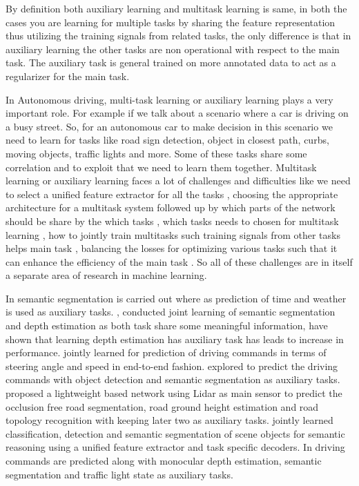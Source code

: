     By definition both auxiliary learning and multitask learning is same, in both the cases you are learning for multiple tasks by sharing the feature representation thus utilizing the training signals from related tasks, the only difference is that in auxiliary learning the other tasks are non operational with respect to the main task. The auxiliary task is general trained on more annotated data to act as a regularizer for the main task. 
    
    In Autonomous driving, multi-task learning or auxiliary learning plays a very important role. For example if we talk about a scenario where a car is driving on a busy street. So, for an autonomous car to make decision in this scenario we need to learn for tasks like road sign detection, object in closest path, curbs, moving objects, traffic lights and more. Some of these tasks share some correlation and to exploit that we need to learn them together. Multitask learning or auxiliary learning faces a lot of challenges and difficulties like we need to select a unified feature extractor for all the tasks \cite{DBLP:journals/corr/abs-2108-11353}, choosing the appropriate architecture for a multitask system followed up by which parts of the network should be share by the which tasks \cite {Liu_2020_ACCV} \cite{ruder2018latent} \cite{DBLP:journals/corr/abs-1904-02920}, which tasks needs to chosen for multitask learning \cite{DBLP:journals/corr/abs-2110-07301} \cite{DBLP:journals/corr/abs-1904-04153}, how to jointly train multitasks such training signals from other tasks helps main task \cite{DBLP:journals/corr/abs-1903-12117} \cite{DBLP:journals/corr/abs-2007-06889} \cite{DBLP:journals/corr/abs-2001-06782} \cite{Guo_2018_ECCV}, balancing the losses for optimizing various tasks such that it can enhance the efficiency of the main task \cite{DBLP:journals/corr/abs-1904-08492} \cite{pmlr-v80-chen18a} \cite{du2020adapting}. So all of these challenges are in itself a separate area of research in machine learning. 
    
    In \cite{DBLP:journals/corr/abs-1805-06334} semantic segmentation is carried out where as prediction of time and weather is used as auxiliary tasks. \cite{teichmann2018multinet}, \cite{7785137} conducted joint learning of semantic segmentation and depth estimation as both task share some meaningful information, have shown that learning depth estimation has auxiliary task has leads to increase in performance. \cite{yang2018endtoend} jointly learned for prediction of driving commands in terms of steering angle and speed in end-to-end fashion. \cite{Wang2019EndtoEndSU} explored to predict the driving commands with object detection and semantic segmentation as auxiliary tasks. \cite{9090850} proposed a lightweight based network using Lidar as main sensor to predict the occlusion free road segmentation, road ground height estimation and road topology recognition with keeping later two as auxiliary tasks. \cite{teichmann2018multinet} jointly learned classification, detection and semantic segmentation of scene objects for semantic reasoning using a unified feature extractor and task specific decoders. In \cite{9523129} driving commands are predicted along with monocular depth estimation, semantic segmentation and traffic light state as auxiliary tasks. 
    
